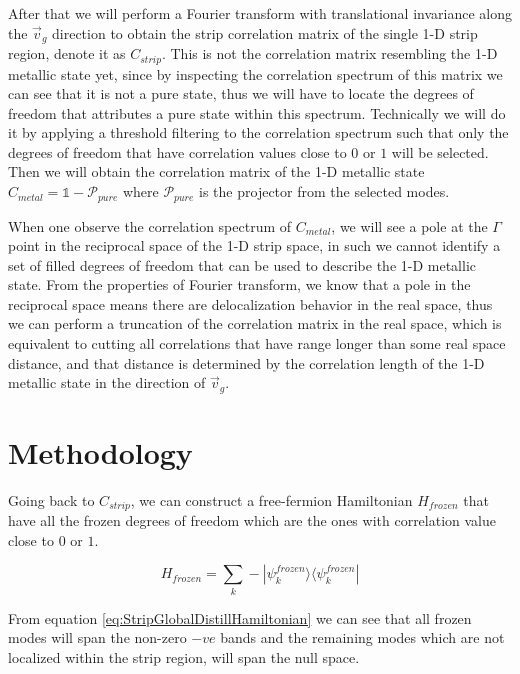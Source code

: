 \documentclass[%
    reprint,
    amsmath,amssymb,
    aps,
    floatfix,
]{revtex4-2}
\theoremstyle{plain}
\begin{document}
After that we will perform a Fourier transform with translational invariance along the $\vec{v}_{g}$ direction to obtain the strip correlation 
matrix of the single 1-D strip region, denote it as $C_{strip}$. This is not the correlation matrix resembling the 1-D metallic state yet, since 
by inspecting the correlation spectrum of this matrix we can see that it is not a pure state, thus we will have to locate the degrees of freedom 
that attributes a pure state within this spectrum. Technically we will do it by applying a threshold filtering to the correlation spectrum such 
that only the degrees of freedom that have correlation values close to $0$ or $1$ will be selected. Then we will obtain the correlation matrix of 
the 1-D metallic state $C_{metal} = \mathds{1} - \mathcal{P}_{pure}$ where $\mathcal{P}_{pure}$ is the projector from the selected modes.

When one observe the correlation spectrum of $C_{metal}$, we will see a pole at the $\Gamma$ point in the reciprocal space of the 1-D strip space, 
in such we cannot identify a set of filled degrees of freedom that can be used to describe the 1-D metallic state. From the properties of Fourier 
transform, we know that a pole in the reciprocal space means there are delocalization behavior in the real space, thus we can perform a truncation 
of the correlation matrix in the real space, which is equivalent to cutting all correlations that have range longer than some real space distance, 
and that distance is determined by the correlation length of the 1-D metallic state in the direction of $\vec{v}_{g}$.

\section{Methodology}
Going back to $C_{strip}$, we can construct a free-fermion Hamiltonian $H_{frozen}$ that have all the frozen degrees of freedom which are the ones 
with correlation value close to $0$ or $1$.

\begin{equation}
    \label{eq:StripGlobalDistillHamiltonian}
    H_{frozen} = \sum_{k} - |\psi_{k}^{frozen} \rangle \langle \psi_{k}^{frozen}|
\end{equation}

From equation \ref{eq:StripGlobalDistillHamiltonian} we can see that all frozen modes will span the non-zero $-ve$ bands and the remaining modes 
which are not localized within the strip region, will span the null space.
\end{document}
